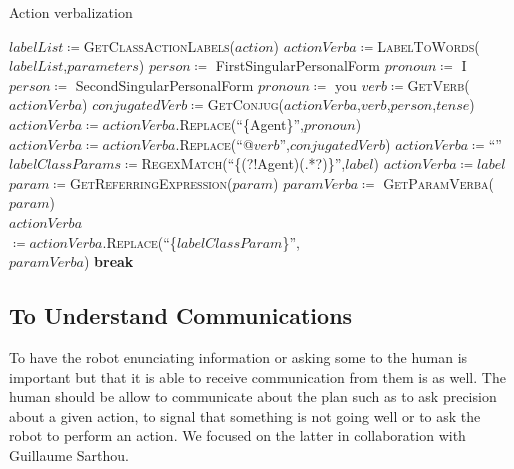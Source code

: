 \documentclass[a4paper,11pt,twoside]{StyleThese}
\begin{document}
\begin{algorithm}[!htb]
	\caption{Action verbalization}
	\label{chap6:algo:action_verba}
	\begin{algorithmic}
	\State $labelList \coloneqq$\textsc{GetClassActionLabels($action$)}
	\State $actionVerba \coloneqq$\textsc{LabelToWords}($labelList$,$parameters$)
		\State $person \coloneqq$ FirstSingularPersonalForm
		\State $pronoun \coloneqq$ I
		\State $person \coloneqq$ SecondSingularPersonalForm
		\State $pronoun \coloneqq$ you
	\EndIf
	\State $verb \coloneqq$\textsc{GetVerb}($actionVerba$)
	\State $conjugatedVerb \coloneqq$\textsc{GetConjug}($actionVerba$,$verb$,$person$,$tense$)
	\State $actionVerba \coloneqq actionVerba.$\textsc{Replace}(``\{Agent\}'',$pronoun$)
	\State $actionVerba \coloneqq actionVerba.$\textsc{Replace}(``@$verb$'',$conjugatedVerb$)
	\EndFunction
	\Statex
	\State $actionVerba \coloneqq$``''
		\State $labelClassParams \coloneqq$\textsc{RegexMatch}(``\{(?!Agent)(.*?)\}'',$label$)
			 
					\State $actionVerba \coloneqq label$
				\EndIf
					\State $param \coloneqq$\textsc{GetReferringExpression($param$)}
				\Else
					\State $paramVerba \coloneqq$ \textsc{GetParamVerba($param$)}\\\hfill{}
				\EndIf
				\State $actionVerba$ \\\hfill $\coloneqq actionVerba.$\textsc{Replace}(``\{$labelClassParam$\}'',\\\hfill$paramVerba$)
				\State \textbf{break}
			\EndIf
			\EndFor
		\EndFor
		\EndIf
	\EndFor
	\EndFunction
	\end{algorithmic}
\end{algorithm}	
	


\subsection{To Understand Communications}\label{chap6:subsec:und_comm}
To have the robot enunciating information or asking some to the human is important but that it is able to receive communication from them is as well. The human should be allow to communicate about the plan such as to ask precision about a given action, to signal that something is not going well or to ask the robot to perform an action. We focused on the latter in collaboration with Guillaume Sarthou. 
\end{document}
